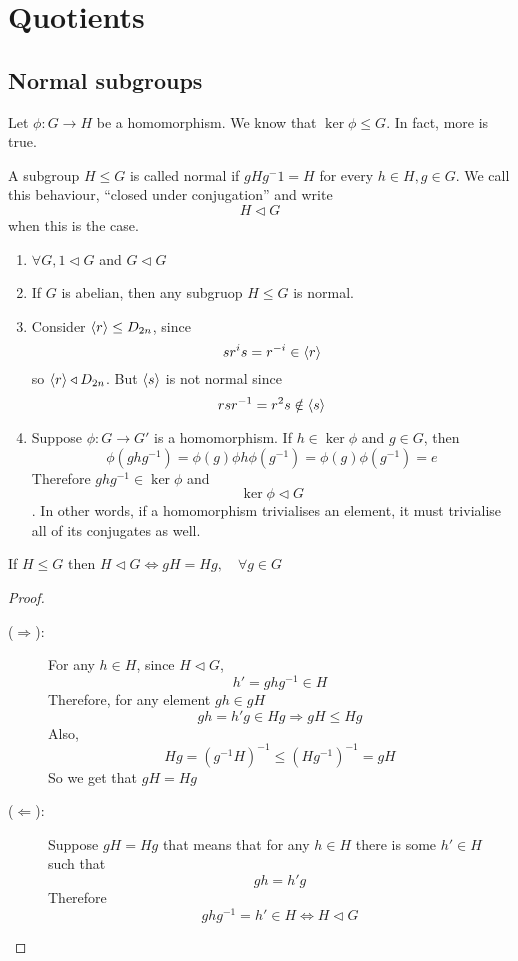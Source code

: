 \documentclass{article}
\begin{document}
\section{Quotients}
\subsection{Normal subgroups}
Let $\phi: G \rightarrow H$ be a homomorphism. We know that $\ker \phi \leq G$. In fact, more is true.

\begin{defi}
    A subgroup $H \leq G$ is called normal if $gHg^-1 = H$ for every $h \in H, g \in G$. 
    We call this behaviour, ``closed under conjugation'' and write
    \[
        H \triangleleft G
    \]
    when this is the case.
\end{defi}
\begin{eg}\leavevmode
    \begin{enumerate}
        \item $\forall G, 1 \triangleleft G$ and $G \triangleleft G$
        \item If $G$ is abelian, then any subgruop $H \leq G$ is normal.
        \item Consider $\left\langle r\right\rangle \leq D_{2n}$, since
        \[
            sr^is = r^{-i} \in \left\langle r\right\rangle  
        \]
        so $\left\langle r\right\rangle \triangleleft D_{2n}$. But $\left\langle s\right\rangle$ is not normal since
        \[
            rsr^{-1} = r^2s \notin \left\langle s\right\rangle  
        \]
        \item Suppose $\phi : G \rightarrow G'$ is a homomorphism. If $h \in \ker \phi$ and $g \in G$, then
        \[
            \phi(ghg^{-1}) = \phi(g)\phi{h}\phi(g^{-1}) = \phi(g)\phi(g^{-1}) = e
        \]
        Therefore $ghg^{-1} \in \ker \phi$ and
        \[
            \ker \phi \triangleleft G  
        \].
        In other words, if a homomorphism trivialises an element, it must trivialise all of its conjugates as well.
    \end{enumerate}
\end{eg}

\begin{lemma}
    If $H \leq G$ then $H \triangleleft G \Longleftrightarrow gH = Hg, \quad \forall g \in G$
\end{lemma}
\begin{proof}\leavevmode
    \begin{description}
        \item[($\Longrightarrow$):] For any $h \in H$, since $H \triangleleft G$,
        \[
            h' = ghg^{-1} \in H  
        \]
        Therefore, for any element $gh \in gH$
        \[
            gh = h'g \in Hg \Longrightarrow gH \leq Hg
        \]
        Also,
        \[
            Hg = (g^{-1}H)^{-1} \leq (Hg^{-1})^{-1} = gH
        \]
        So we get that $gH = Hg$
        \item[($\Longleftarrow$):] Suppose $gH = Hg$ that means that for any $h \in H$ there is some $h' \in H$ such that
        \[
            gh = h'g  
        \]
        Therefore
        \[
        ghg^{-1} = h' \in H \iff H \triangleleft G 
        \]
    \end{description}
\end{proof}
\end{document}
